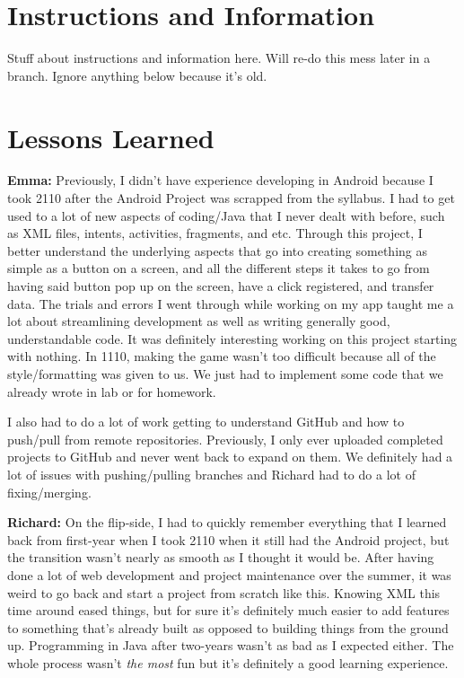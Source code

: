 \documentclass[12pt]{article}
\begin{document}
\maketitle

\section{Instructions and Information}
\noindent Stuff about instructions and information here. Will re-do this mess later in a branch. Ignore anything below because it's old.

\section{Lessons Learned}
\textbf{Emma:} Previously, I didn't have experience developing in Android because I took 2110 after the Android Project was scrapped from the syllabus. I had to get used to a lot of new aspects of coding/Java that I never dealt with before, such as XML files, intents, activities, fragments, and etc. Through this project, I better understand the underlying aspects that go into creating something as simple as a button on a screen, and all the different steps it takes to go from having said button pop up on the screen, have a click registered, and transfer data. The trials and errors I went through while working on my app taught me a lot about streamlining development as well as writing generally good, understandable code. It was definitely interesting working on this project starting with nothing. In 1110, making the game wasn't too difficult because all of the style/formatting was given to us. We just had to implement some code that we already wrote in lab or for homework. \break

\noindent I also had to do a lot of work getting to understand GitHub and how to push/pull from remote repositories. Previously, I only ever uploaded completed projects to GitHub and never went back to expand on them. We definitely had a lot of issues with pushing/pulling branches and Richard had to do a lot of fixing/merging.\break

\noindent \textbf{Richard:} On the flip-side, I had to quickly remember everything that I learned back from first-year when I took 2110 when it still had the Android project, but the transition wasn't nearly as smooth as I thought it would be. After having done a lot of web development and project maintenance over the summer, it was weird to go back and start a project from scratch like this. Knowing XML this time around eased things, but for sure it's definitely much easier to add features to something that's already built as opposed to building things from the ground up. Programming in Java after two-years wasn't as bad as I expected either. The whole process wasn't \textit{the most} fun but it's definitely a good learning experience.\break
\end{document}
